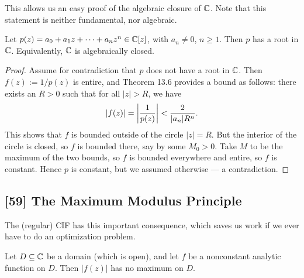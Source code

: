 \documentclass{article}
\begin{document}
This allows us an easy proof of the algebraic closure of $\mathbb C$. Note that this statement is neither fundamental, nor algebraic. \newpage
\begin{theorem}
Let $p(z) = a_0 + a_1z + \cdots + a_nz^n\in\mathbb C[z]$, with $a_n\neq 0$, $n\geq 1$. Then $p$ has a root in $\mathbb C$. Equivalently, $\mathbb C$ is algebraically closed.
\end{theorem}
\begin{proof}
Assume for contradiction that $p$ does not have a root in $\mathbb C$. Then $f(z) := 1/p(z)$ is entire, and Theorem 13.6 provides a bound as follows: there exists an $R>0$ such that for all $|z|>R$, we have
$$|f(z)| = \left|\frac 1{p(z)}\right| < \frac 2{|a_n|R^n}.$$
This shows that $f$ is bounded outside of the circle $|z|=R$. But the interior of the circle is closed, so $f$ is bounded there, say by some $M_0>0$. Take $M$ to be the maximum of the two bounds, so $f$ is bounded everywhere and entire, so $f$ is constant. Hence $p$ is constant, but we assumed otherwise --- a contradiction.
\end{proof}
\subsection*{[59] The Maximum Modulus Principle}
The (regular) CIF has this important consequence, which saves us work if we ever have to do an optimization problem.
\begin{theorem}
Let $D\subseteq\mathbb C$ be a domain (which is open), and let $f$ be a nonconstant analytic function on $D$. Then $|f(z)|$ has no maximum on $D$.
\end{theorem}
\end{document}
